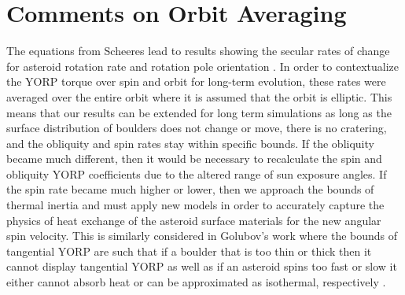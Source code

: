 \section{Comments on Orbit Averaging}
The equations from Scheeres lead to results showing the secular rates of change for asteroid rotation rate and rotation pole orientation \citep{Scheeres2007}. In order to contextualize the YORP torque over spin and orbit for long-term evolution, these rates were averaged over the entire orbit where it is assumed that the orbit is elliptic. This means that our results can be extended for long term simulations as long as the surface distribution of boulders does not change or move, there is no cratering, and the obliquity and spin rates stay within specific bounds. If the obliquity became much different, then it would be necessary to recalculate the spin and obliquity YORP coefficients due to the altered range of sun exposure angles. If the spin rate became much higher or lower, then we approach the bounds of thermal inertia and must apply new models in order to accurately capture the physics of heat exchange of the asteroid surface materials for the new angular spin velocity. This is similarly considered in Golubov's work where the bounds of tangential YORP are such that if a boulder that is too thin or thick then it cannot display tangential YORP as well as if an asteroid spins too fast or slow it either cannot absorb heat or can be approximated as isothermal, respectively \citep{Golubov2017}.


